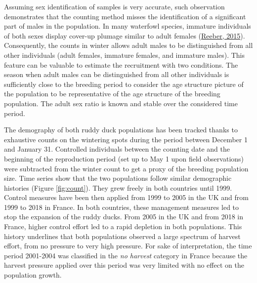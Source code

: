 \documentclass[
  english,
]{article}
\begin{document}
Assuming sex identification of samples is very accurate, such observation demonstrates that the counting method misses the identification of a significant part of males in the population. In many waterfowl species, immature individuals of both sexes display cover-up plumage similar to adult females (\protect\hyperlink{ref-Reeber2015}{Reeber, 2015}). Consequently, the counts in winter allows adult males to be distinguished from all other individuals (adult females, immature females, and immature males). This feature can be valuable to estimate the recruitment with two conditions. The season when adult males can be distinguished from all other individuals is sufficiently close to the breeding period to consider the age structure picture of the population to be representative of the age structure of the breeding population. The adult sex ratio is known and stable over the considered time period.

The demography of both ruddy duck populations has been tracked thanks to exhaustive counts on the wintering spots during the period between December 1 and January 31. Controlled individuals between the counting date and the beginning of the reproduction period (set up to May 1 upon field observations) were subtracted from the winter count to get a proxy of the breeding population size. Time series show that the two populations follow similar demographic histories (Figure \ref{fig:count}). They grew freely in both countries until 1999. Control measures have been then applied from 1999 to 2005 in the UK and from 1999 to 2018 in France. In both countries, these management measures led to stop the expansion of the ruddy ducks. From 2005 in the UK and from 2018 in France, higher control effort led to a rapid depletion in both populations. This history underlines that both populations observed a large spectrum of harvest effort, from no pressure to very high pressure. For sake of interpretation, the time period 2001-2004 was classified in the \emph{no harvest} category in France because the harvest pressure applied over this period was very limited with no effect on the population growth.
\end{document}
